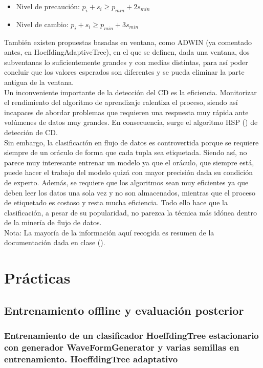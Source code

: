 \begin{itemize}
	\item Nivel de precaución: $p_i + s_i \geq p_{min} + 2 s_{min}$
	\item Nivel de cambio: $p_i + s_i \geq p_{min} + 3 s_{min}$
\end{itemize} 


También existen propuestas basadas en ventana, como ADWIN (ya comentado antes, en HoeffdingAdaptiveTree), en el que se definen, dada una ventana, dos subventanas lo suficientemente grandes y con medias distintas, para así poder concluir que los valores esperados son diferentes y se pueda eliminar la parte antigua de la ventana. \\

Un inconveniente importante de la detección del CD es la eficiencia. Monitorizar el rendimiento del algoritmo de aprendizaje ralentiza el proceso, siendo así incapaces de abordar problemas que requieren una respuesta muy rápida ante volúmenes de datos muy grandes. En consecuencia, surge el algoritmo HSP (\cite{hsp}) de detección de CD. \\

Sin embargo, la clasificación en flujo de datos es controvertida porque se requiere siempre de un oráculo de forma que cada tupla sea etiquetada. Siendo así, no parece muy interesante entrenar un modelo ya que el oráculo, que siempre está, puede hacer el trabajo del modelo quizá con mayor precisión dada su condición de experto. Además, se requiere que los algoritmos sean muy eficientes ya que deben leer los datos una sola vez y no son almacenados, mientras que el proceso de etiquetado es costoso y resta mucha eficiencia. Todo ello hace que la clasificación, a pesar de su popularidad, no parezca la técnica más idónea dentro de la minería de flujo de datos. \\

Nota: La mayoría de la información aquí recogida es resumen de la documentación dada en clase (\cite{apuntes}).
\newpage
\section{Prácticas}

\subsection{Entrenamiento offline y evaluación posterior}

\subsubsection{Entrenamiento de un clasificador HoeffdingTree estacionario con generador WaveFormGenerator y varias semillas en entrenamiento. HoeffdingTree adaptativo}

